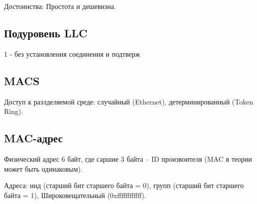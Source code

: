Достоинства: Простота и дешевизна.

\subsection{Подуровень LLC}

1 - без установления соединения и подтверж

\subsection{MACS}

Доступ к разлделяемой среде: случайный (Ethernet), детерминированный (Token Ring).

\subsection{MAC-адрес}

Физический адрес 6 байт, где саршие 3 байта – ID произвоителя (MAC в теории может быть одинаковым).

Адреса: инд (старший бит старшего байта = 0), групп (старший бит старшего байта = 1), Широковещательный (0xffffffffffff).

